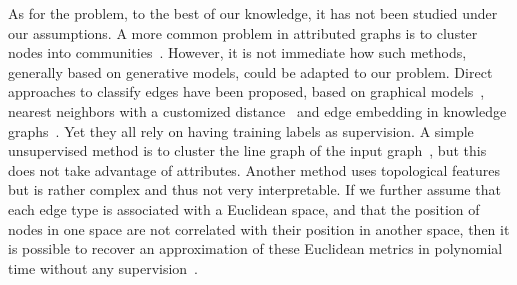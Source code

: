 As for the \ecp{} problem, to the best of our knowledge, it has not been studied under our
assumptions. A more common problem in attributed graphs is to cluster nodes into
communities~\autocites{LeskovecEgo12}{Yang2013}{Xu2014}{ZhangModelFree16}. However, it is not
immediate how such methods, generally based on generative models, could be adapted to our problem.
Direct approaches to classify edges have been proposed, based on graphical
models~\autocite{graphicalModelTies11}, nearest neighbors with a customized
distance~\autocite{Aggarwal2016a} and edge embedding in knowledge graphs~\autocite{transE13}. Yet
they all rely on having training labels as supervision. A simple unsupervised method is to cluster
the line graph of the input graph~\autocite{LineGraph09}, but this does not take advantage of
attributes. Another method uses topological features~\autocite{ahmed2017roles} but is rather complex
and thus not very interpretable. If we further assume that each edge type is associated with a
Euclidean space, and that the position of nodes in one space are not correlated with their position
in another space, then it is possible to recover an approximation of these Euclidean metrics in
polynomial time without any supervision~\autocite{Abraham2012a}.
